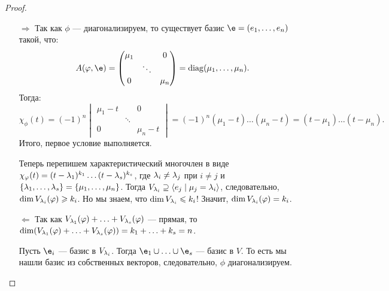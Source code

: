 \begin{proof}\
  \begin{itemize}
  \item[$\Rightarrow$] Так как $\phi$ --- диагонализируем, то существует базис $\e = (e_1, \ldots, e_n)$ такой, что:
    \begin{gather*}
      A(\phi, \e) = 
      \begin{pmatrix*}
        \mu_1 & & 0 \\
        & \ddots & \\
        0 & & \mu_n
      \end{pmatrix*} = \diag(\mu_1, \ldots, \mu_n).
    \end{gather*}
    Тогда:
    $$
    \chi_\phi(t) = (-1)^n 
    \begin{vmatrix}
      \mu_1-t & & 0 \\
      & \ddots & \\
      0 & & \mu_n-t
    \end{vmatrix} = (-1)^n(\mu_1 - t)\ldots(\mu_n - t) = (t - \mu_1)\ldots(t-\mu_n).
    $$
    Итого, первое условие выполняется.

    Теперь перепишем характеристический многочлен в виде $\chi_\varphi(t) = (t - \lambda_1)^{k_1}\dots(t - \lambda_s)^{k_s}$, где $\lambda_i \neq \lambda_j$ при $i \neq j$ и $\{ \lambda_1, \ldots, \lambda_s \} = \{\mu_1, \ldots, \mu_n \}$. Тогда $V_{\lambda_i} \supseteq \langle e_j \mid \mu_j = \lambda_i \rangle$, следовательно, $\dim V_{\lambda_i}(\varphi) \geqslant k_i$. Но мы знаем, что $\dim V_{\lambda_i} \leqslant k_i$! Значит, $\dim V_{\lambda_i}(\varphi) = k_i$.

  \item[$\Leftarrow$] Так как $V_{\lambda_1}(\varphi) + \ldots + V_{\lambda_s}(\varphi)$ --- прямая, то $\dim (V_{\lambda_1}(\varphi) + \ldots + V_{\lambda_s}(\varphi)) = k_1 + \ldots + k_s = n$.

    Пусть $\e_i$ --- базис в $V_{\lambda_i}$. Тогда $\e_1 \cup \ldots \cup \e_s$ --- базис в $V$. То есть мы нашли базис из собственных векторов, следовательно, $\phi$ диагонализируем.
  \end{itemize}
\end{proof}

